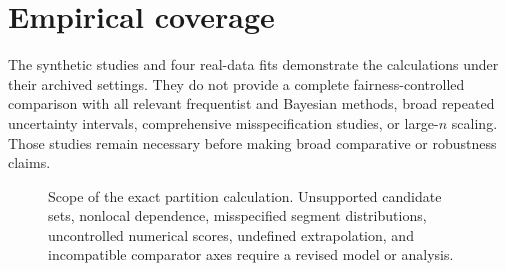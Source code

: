 \section{Empirical coverage}
The synthetic studies and four real-data fits demonstrate the calculations under their archived
settings. They do not provide a complete fairness-controlled comparison with all relevant
frequentist and Bayesian methods, broad repeated uncertainty intervals, comprehensive
misspecification studies, or large-$n$ scaling. Those studies remain necessary before making broad
comparative or robustness claims.

\begin{figure}[H]
\centering
\resizebox{0.96\textwidth}{!}{}
\caption[Scope and failure modes]{Scope of the exact partition calculation. Unsupported candidate
sets, nonlocal dependence, misspecified segment distributions, uncontrolled numerical scores,
undefined extrapolation, and incompatible comparator axes require a revised model or analysis.}
\label{fig:scope-failure-map}
\end{figure}
